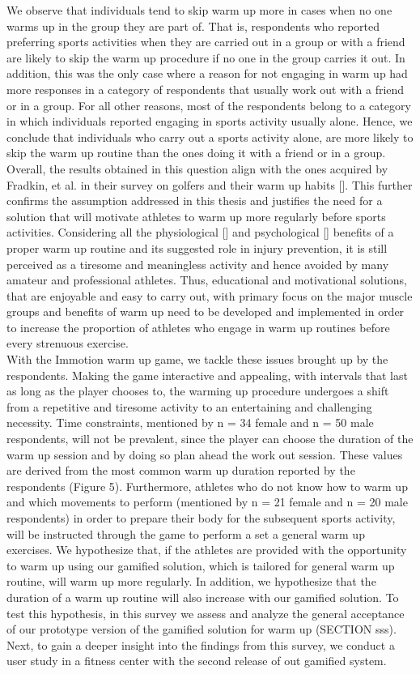 We observe that individuals tend to skip warm up more in cases when no one warms up in the group they are part of. That is, respondents who reported preferring sports activities when they are carried out in a group or with a friend are likely to skip the warm up procedure if no one in the group carries it out. In addition, this was the only case where a reason for not engaging in warm up had more responses in a category of respondents that usually work out with a friend or in a group. For all other reasons, most of the respondents belong to a category in which individuals reported engaging in sports activity usually alone. Hence, we conclude that individuals who carry out a sports activity alone, are more likely to skip the warm up routine than the ones doing it with a friend or in a group.\\ Overall, the results obtained in this question align with the ones acquired by Fradkin, et al. in their survey on golfers and their warm up habits []. This further confirms the assumption addressed in this thesis and justifies the need for a solution that will motivate athletes to warm up more regularly before sports activities. Considering all the physiological [] and psychological [] benefits of a proper warm up routine and its suggested role in injury prevention, it is still perceived as a tiresome and meaningless activity and hence avoided by many amateur and professional athletes. Thus, educational and motivational solutions, that are enjoyable and easy to carry out, with primary focus on the major muscle groups and benefits of warm up need to be developed and implemented in order to increase the proportion of athletes who engage in warm up routines before every strenuous exercise.\\
With the Immotion warm up game, we tackle these issues brought up by the respondents. Making the game interactive and appealing, with intervals that last as long as the player chooses to, the warming up procedure undergoes a shift from a repetitive and tiresome activity to an entertaining and challenging necessity. Time constraints, mentioned by n = 34 female and n = 50 male respondents, will not be prevalent, since the player can choose the duration of the warm up session and by doing so plan ahead the work out session. These values are derived from the most common warm up duration reported by the respondents (Figure 5). Furthermore, athletes who do not know how to warm up and which movements to perform (mentioned by n = 21 female and n = 20 male respondents) in order to prepare their body for the subsequent sports activity, will be instructed through the game to perform a set a general warm up exercises. We hypothesize that, if the athletes are provided with the opportunity to warm up using our gamified solution, which is tailored for general warm up routine, will warm up more regularly. In addition, we hypothesize that the duration of a warm up routine will also increase with our gamified solution. To test this hypothesis, in this survey we assess and analyze the general acceptance of our prototype version of the gamified solution for warm up (SECTION sss). Next, to gain a deeper insight into the findings from this survey, we conduct a user study in a fitness center with the second release of out gamified system.
